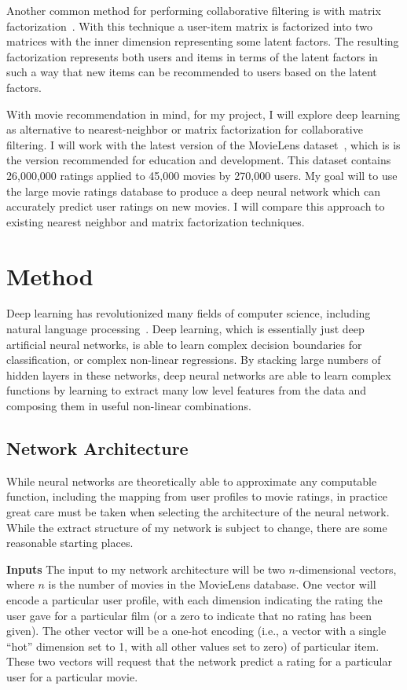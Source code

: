 \documentclass[12pt]{article}
\begin{document}
Another common method for performing collaborative filtering is with matrix
factorization~\cite{matrix-factorization}.
With this technique a user-item matrix is factorized into two matrices with the
inner dimension representing some latent factors.
The resulting factorization represents both users and items in terms of the
latent factors in such a way that new items can be recommended to users based
on the latent factors.

With movie recommendation in mind, for my project, I will explore deep learning
as alternative to nearest-neighbor or matrix factorization for collaborative
filtering.
I will work with the latest version of the MovieLens dataset~\cite{movielens}, 
which is is the version recommended for education and development.
This dataset contains 26,000,000 ratings applied to 45,000 movies by 270,000
users.
My goal will to use the large movie ratings database to produce a deep neural
network which can accurately predict user ratings on new movies.
I will compare this approach to existing nearest neighbor and matrix
factorization techniques.

\section{Method}

Deep learning has revolutionized many fields of computer science, including
natural language processing~\cite{deep-survey}.
Deep learning, which is essentially just deep artificial neural networks, is
able to learn complex decision boundaries for classification, or complex
non-linear regressions.
By stacking large numbers of hidden layers in these networks, deep neural
networks are able to learn complex functions by learning to extract many low
level features from the data and composing them in useful non-linear
combinations.

\subsection{Network Architecture}

While neural networks are theoretically able to approximate any computable
function, including the mapping from user profiles to movie ratings, in
practice great care must be taken when selecting the architecture of the
neural network. While the extract structure of my network is subject to change,
there are some reasonable starting places.

\textbf{Inputs} The input to my network architecture will be two
$n$-dimensional vectors, where $n$ is the number of movies in the MovieLens
database.
One vector will encode a particular user profile, with each dimension
indicating the rating the user gave for a particular film (or a zero to
indicate that no rating has been given).
The other vector will be a one-hot encoding (i.e., a vector with a single
``hot'' dimension set to 1, with all other values set to zero) of particular
item.
These two vectors will request that the network predict a rating for a
particular user for a particular movie.
\end{document}
